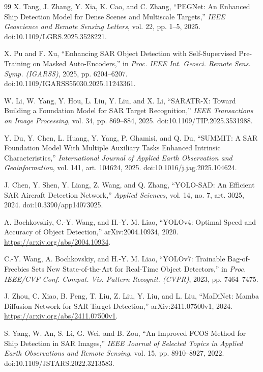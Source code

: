 \documentclass[journal]{IEEEtran}
\begin{document}
\begin{thebibliography}{99}
X. Tang, J. Zhang, Y. Xia, K. Cao, and C. Zhang,
``PEGNet: An Enhanced Ship Detection Model for Dense Scenes and Multiscale Targets,''
\emph{IEEE Geoscience and Remote Sensing Letters},
vol. 22, pp. 1--5, 2025. doi:10.1109/LGRS.2025.3528221.

X. Pu and F. Xu,
``Enhancing SAR Object Detection with Self-Supervised Pre-Training on Masked Auto-Encoders,''
in \emph{Proc. IEEE Int. Geosci. Remote Sens. Symp. (IGARSS)},
2025, pp. 6204--6207. doi:10.1109/IGARSS55030.2025.11243361.

W. Li, W. Yang, Y. Hou, L. Liu, Y. Liu, and X. Li,
``SARATR-X: Toward Building a Foundation Model for SAR Target Recognition,''
\emph{IEEE Transactions on Image Processing},
vol. 34, pp. 869--884, 2025. doi:10.1109/TIP.2025.3531988.

Y. Du, Y. Chen, L. Huang, Y. Yang, P. Ghamisi, and Q. Du, ``SUMMIT: A SAR Foundation Model With Multiple Auxiliary Tasks Enhanced Intrinsic Characteristics,'' \emph{International Journal of Applied Earth Observation and Geoinformation}, vol. 141, art. 104624, 2025. doi:10.1016/j.jag.2025.104624.

J. Chen, Y. Shen, Y. Liang, Z. Wang, and Q. Zhang, ``YOLO-SAD: An Efficient SAR Aircraft Detection Network,'' \emph{Applied Sciences}, vol. 14, no. 7, art. 3025, 2024. doi:10.3390/app14073025.

A. Bochkovskiy, C.-Y. Wang, and H.-Y. M. Liao,
``YOLOv4: Optimal Speed and Accuracy of Object Detection,''
arXiv:2004.10934, 2020. \url{https://arxiv.org/abs/2004.10934}.

C.-Y. Wang, A. Bochkovskiy, and H.-Y. M. Liao,
``YOLOv7: Trainable Bag-of-Freebies Sets New State-of-the-Art for Real-Time Object Detectors,''
in \emph{Proc. IEEE/CVF Conf. Comput. Vis. Pattern Recognit. (CVPR)},
2023, pp. 7464--7475.

J. Zhou, C. Xiao, B. Peng, T. Liu, Z. Liu, Y. Liu, and L. Liu,
``MaDiNet: Mamba Diffusion Network for SAR Target Detection,''
arXiv:2411.07500v1, 2024. \url{https://arxiv.org/abs/2411.07500v1}.

S. Yang, W. An, S. Li, G. Wei, and B. Zou,
``An Improved FCOS Method for Ship Detection in SAR Images,''
\emph{IEEE Journal of Selected Topics in Applied Earth Observations and Remote Sensing},
vol. 15, pp. 8910--8927, 2022. doi:10.1109/JSTARS.2022.3213583.


\end{thebibliography}
\end{document}
